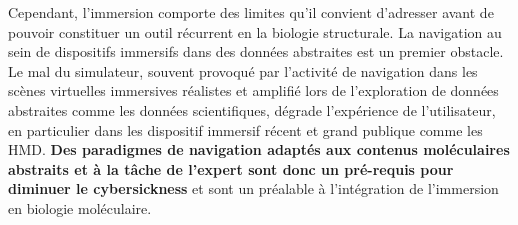 
Cependant, l'immersion comporte des limites qu'il convient d'adresser avant de pouvoir constituer un outil récurrent en la biologie structurale. La navigation au sein de dispositifs immersifs dans des données abstraites est un premier obstacle. Le mal du simulateur, souvent provoqué par l'activité de navigation dans les scènes virtuelles immersives réalistes et amplifié lors de l'exploration de données abstraites comme les données scientifiques, dégrade l'expérience de l'utilisateur, en particulier dans les dispositif immersif récent et grand publique comme les HMD. \textbf{Des paradigmes de navigation adaptés aux contenus moléculaires abstraits et à la tâche de l'expert sont donc un pré-requis pour diminuer le cybersickness} et sont un préalable à l'intégration de l'immersion en biologie moléculaire.




